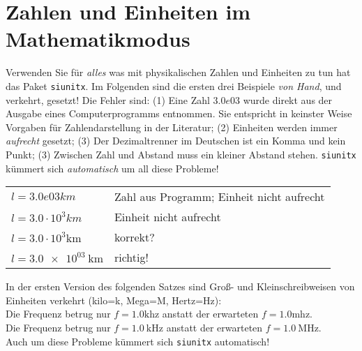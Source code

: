 \documentclass[11pt,a4paper]{scrartcl}
\begin{document}
\section{Zahlen und Einheiten im Mathematikmodus}
%
Verwenden Sie für \emph{alles} was mit physikalischen Zahlen und
Einheiten zu tun hat das Paket \texttt{siunitx}. Im Folgenden sind die
ersten drei Beispiele \emph{von Hand}, und verkehrt, gesetzt! Die
Fehler sind: (1) Eine Zahl $3.0e03$ wurde direkt aus der Ausgabe eines
Computerprogramms entnommen. Sie entspricht in keinster Weise Vorgaben
für Zahlendarstellung in der Literatur; (2) Einheiten werden immer
\emph{aufrecht} gesetzt; (3) Der Dezimaltrenner im Deutschen ist ein
Komma und kein Punkt; (3) Zwischen Zahl und Abstand muss ein kleiner
Abstand stehen. \texttt{siunitx} kümmert sich \emph{automatisch} um
all diese Probleme!
%
\begin{center}
  \begin{tabular}{ll}
    $l=3.0e03 km$ &  Zahl aus Programm; Einheit nicht aufrecht \\
    $l=3.0\cdot 10^{3} km$ & Einheit nicht aufrecht \\
    $l=3.0\cdot 10^{3} \mathrm{km}$ & korrekt?\\
    $l=\SI{3.0e03}{\kilo\meter}$ & richtig! \\
  \end{tabular}
\end{center}

In der ersten Version des folgenden Satzes sind Groß- und
Kleinschreibweisen von Einheiten verkehrt (kilo=k, Mega=M, Hertz=Hz): \\
Die Frequenz betrug nur $f=1.0 \mathrm{khz}$ anstatt der erwarteten
$f=1.0 \mathrm{mhz}$. \\
Die Frequenz betrug nur $f=\SI{1.0}{\kilo\hertz}$ anstatt der
erwarteten $f=\SI{1,0}{\mega\hertz}$. \\
Auch um diese Probleme kümmert sich \texttt{siunitx} automatisch!
%
\end{document}
